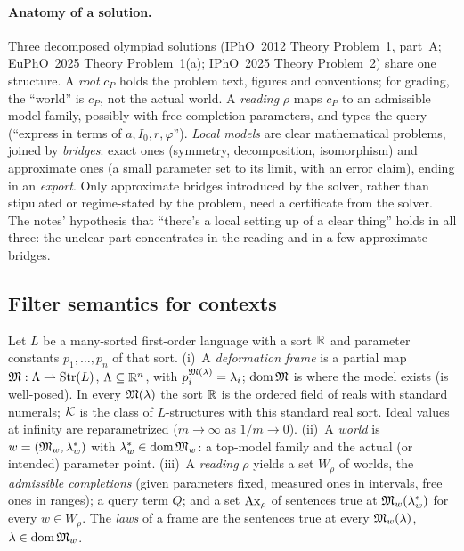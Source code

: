 \paragraph{Anatomy of a solution.} Three decomposed olympiad solutions (IPhO~2012
Theory Problem~1, part~A; EuPhO~2025 Theory Problem~1(a); IPhO~2025 Theory Problem~2)
share one structure. A \emph{root} $c_P$ holds the problem text, figures and
conventions; for grading, the ``world'' is $c_P$, not the actual world. A
\emph{reading} $\rho$ maps $c_P$ to an admissible model family, possibly with free
completion parameters, and types the query (``express in terms of $a,I_0,r,\varphi$'').
\emph{Local models} are clear mathematical problems, joined by \emph{bridges}: exact
ones (symmetry, decomposition, isomorphism) and approximate ones (a small parameter
set to its limit, with an error claim), ending in an \emph{export}. Only approximate
bridges introduced by the solver, rather than stipulated or regime-stated by the problem,
need a certificate from the solver. The notes' hypothesis that ``there's a local
setting up of a clear thing'' holds in all three: the unclear part concentrates in the
reading and in a few approximate bridges.

\subsection{Filter semantics for contexts}\label{sec:physics:semantics}

\begin{definition}\label{def:physics:frame}
Let $L$ be a many-sorted first-order language with a sort $\mathbb{R}$ and parameter constants
$p_1,\dots,p_n$ of that sort. (i)~A \emph{deformation frame} is a partial map
$\mathfrak{M}:\Lambda\rightharpoonup\mathrm{Str}(L)$, $\Lambda\subseteq\mathbb{R}^n$, with
$p_i^{\mathfrak{M}(\lambda)}=\lambda_i$; $\operatorname{dom}\mathfrak{M}$ is where the model exists (is well-posed). In
every $\mathfrak{M}(\lambda)$ the sort $\mathbb{R}$ is the ordered field of reals with standard numerals;
$\mathcal{K}$ is the class of $L$-structures with this standard real sort. Ideal values at
infinity are reparametrized ($m\to\infty$ as $1/m\to0$). (ii)~A \emph{world} is
$w=(\mathfrak{M}_w,\lambda^*_w)$ with $\lambda^*_w\in\operatorname{dom}\mathfrak{M}_w$: a top-model family and the actual
(or intended) parameter point. (iii)~A \emph{reading} $\rho$ yields a set $W_\rho$ of
worlds, the \emph{admissible completions} (given parameters fixed, measured ones in
intervals, free ones in ranges); a query term $Q$; and a set $\mathrm{Ax}_\rho$ of sentences true
at $\mathfrak{M}_w(\lambda^*_w)$ for every $w\in W_\rho$. The \emph{laws} of a frame are the
sentences true at every $\mathfrak{M}_w(\lambda)$, $\lambda\in\operatorname{dom}\mathfrak{M}_w$.
\end{definition}

